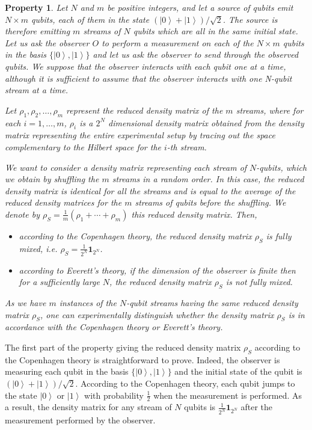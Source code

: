\documentclass[11pt,amsmath,amssymb,latexsym,a4paper]{article}
\newtheorem{myProperty}{Property}
\newcommand{\ket}[1]{\left|{#1}\right>}
\newcommand{\toshIdentity}{{\mathbf{1}}}
\newcommand{\highlight}[1] {#1}
\begin{document}
\begin{myProperty}
Let $N$ and $m$ be positive integers, and let a source of qubits emit $N\times m$ qubits, each of them in the state $(\ket{0}+\ket{1})/\sqrt{2}$. The source is therefore emitting $m$ streams of $N$ qubits which are all in the same initial state. Let us ask the observer $O$ to perform a measurement on each of the $N\times m$ qubits in the basis $\{\ket{0},\ket{1}\}$ and let us ask the observer to send through the observed qubits.  \highlight{We suppose that the observer interacts with each qubit one at a time, although it is sufficient to assume that the observer interacts with one N-qubit stream at a time.}

Let $\rho_1,\rho_2,\ldots, \rho_m$ represent the reduced density matrix of the $m$ streams, where for each $i=1,\ldots,m$, $\rho_i$ is a $2^N$ dimensional density matrix obtained from the density matrix representing the entire experimental setup by tracing out the space complementary to the Hilbert space for the $i$-th stream.


We want to consider a density matrix representing each stream of $N$-qubits, which we obtain by shuffling the $m$ streams in a random order. In this case, the reduced density matrix is identical for all the streams and is equal to the average of the reduced density matrices for the $m$ streams of qubits before the shuffling. We denote by $\rho_S = \frac{1}{m}(\rho_1+\cdots+\rho_m)$ this reduced density matrix. Then, 

\begin{itemize}
\item according to the Copenhagen theory, the reduced density matrix $\rho_S$ is fully mixed, i.e. $\rho_S =\frac{1}{2^N}\toshIdentity_{2^N}$.
\item according to Everett's theory, if the dimension of the observer is finite then for a sufficiently large $N$, the reduced density matrix $\rho_S$ is not fully mixed. 
\end{itemize}

As we have $m$ instances of the $N$-qubit streams having the same reduced density matrix $\rho_S$, one can experimentally distinguish whether the density matrix $\rho_S$ is in accordance with the Copenhagen theory or Everett's theory.
\label{mainResult}
\end{myProperty}

The first part of the property giving the reduced density matrix $\rho_S$ according to the Copenhagen theory is straightforward to prove. Indeed, the observer is measuring each qubit in the basis $\{\ket{0},\ket{1}\}$ and the initial state of the qubit is $(\ket{0}+\ket{1})/\sqrt{2}$. According to the Copenhagen theory, each qubit jumps to the state $\ket{0}$ or $\ket{1}$ with probability $\frac{1}{2}$ when the measurement is performed. As a result, the density matrix for any stream of $N$ qubits is $\frac{1}{2^N}\toshIdentity_{2^N}$ after the measurement performed by the observer.  
\end{document}

